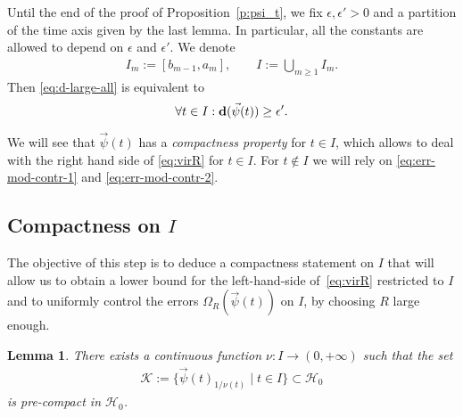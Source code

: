 \documentclass[10pt,reqno]{amsart}
\newcommand{\HH}{\mathcal{H}}
\newcommand{\Om}{\Omega}
\newcommand{\EQ}[1]{\begin{equation}\begin{split} #1 \end{split}\end{equation}}
\numberwithin{equation}{section}
\newtheorem{lem}[thm]{Lemma}
\theoremstyle{remark}
\newcommand{\0}{\emptyset}
\newcommand{\eps}{\epsilon}
\newcommand{\bfd}{{\bf d}}
\newcommand{\calK}{\mathcal K}
\begin{document}
Until the end of the proof of Proposition~\ref{p:psi_t},
we fix $\eps, \eps' > 0$ and a partition of the time axis
given by the last lemma. In particular, all the constants are allowed to depend
on $\eps$ and $\eps'$. We denote
\EQ{
I_m := [b_{m-1}, a_m], \qquad I := \bigcup_{m\geq 1} I_m.
}
Then \eqref{eq:d-large-all} is equivalent to
\begin{equation}
\forall t\in I: \bfd(\vec\psi(t)) \geq \eps'. \label{eq:d-large-I}
\end{equation}

We will see that $\vec\psi(t)$ has a \emph{compactness property} for $t\in I$,
which allows to deal with the right hand side of \eqref{eq:virR} for $t \in I$. For $t \notin I$ we will rely on \eqref{eq:err-mod-contr-1}
and \eqref{eq:err-mod-contr-2}.


\subsection{Compactness on $I$}
The objective of this step is to deduce a compactness statement on $I$ that will allow us to obtain a lower bound for the left-hand-side of~\eqref{eq:virR} restricted to $I$ and to uniformly control the errors $\Om_R(\vec \psi(t))$ on  $I$, by choosing $R$ large enough.
\begin{lem} \label{l:Icompact} 
There exists a continuous function $\nu: I  \to (0, +\infty)$ such that the set 
\EQ{
\calK:=  \{  \vec \psi(t)_{1/\nu(t)} \mid t \in I \} \subset \HH_0 
}
is pre-compact in $\HH_0$. 
\end{lem} 
\end{document}
